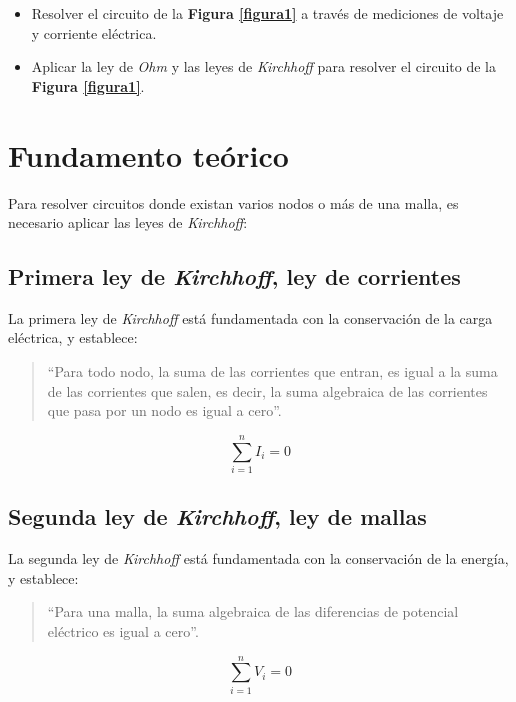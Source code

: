 \documentclass[letter,11pt]{article}
\begin{document}
\begin{itemize}
\item Resolver el circuito de la \textbf{Figura \ref{figura1}} a través de
mediciones de voltaje y corriente eléctrica.
\item Aplicar la ley de \emph{Ohm} y las leyes de \emph{Kirchhoff} para resolver
el circuito de la \textbf{Figura \ref{figura1}}.
\end{itemize}

\section{Fundamento teórico}

Para resolver circuitos donde existan varios nodos o más de una malla, es
necesario aplicar las leyes de \emph{Kirchhoff}:

\subsection{Primera ley de \emph{Kirchhoff}, ley de corrientes}

La primera ley de \emph{Kirchhoff} está fundamentada con la conservación de la
carga eléctrica, y establece:

\begin{quote}
``Para todo nodo, la suma de las corrientes que entran, es igual a la suma de
las corrientes que salen, es decir, la suma algebraica de las corrientes que
pasa por un nodo es igual a cero''.
\end{quote}

\begin{equation}
    \sum_{i=1}^{n} I_i = 0
\label{kirchhoff1}
\end{equation}

\subsection{Segunda ley de \emph{Kirchhoff}, ley de mallas}

La segunda ley de \emph{Kirchhoff} está fundamentada con la conservación de la
energía, y establece:

\begin{quote}
``Para una malla, la suma algebraica de las diferencias de potencial eléctrico
es igual a cero''.
\end{quote}

\begin{equation}
    \sum_{i=1}^{n} V_i = 0
\label{kirchhoff2}
\end{equation}
\end{document}
